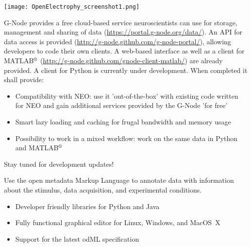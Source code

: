 \begin{multicols}{3}
\vspace{0.5em}
\texttt{[image: OpenElectrophy\_screenshot1.png]}





\vspace{0.5em}

G-Node provides a free cloud-based service neuroscientists can use for storage, management and sharing of data (\url{https://portal.g-node.org/data/}). An API for data access is provided (\url{http://g-node.github.com/g-node-portal/}), allowing developers to code their own clients. A web-based interface as well as a client for MATLAB$^\textrm{\textregistered}$  (\url{http://g-node.github.com/gnode-client-matlab/}) are already provided. A client for Python is currently under development. When completed it shall provide:

\begin{itemize}[nolistsep,topsep=0em,leftmargin=1pc]
\item Compatibility with NEO: use it 'out-of-the-box' with existing code written for NEO and gain additional services provided by the G-Node 'for free'
\item Smart lazy loading and caching for frugal bandwidth and memory usage
\item Possibility to work in a mixed workflow: work on the same data in Python and MATLAB$^\textrm{\textregistered}$
\end{itemize}

Stay tuned for development updates!

%


Use the {open metadata Markup Language} to annotate data with information about the stimulus, data acquisition, and experimental conditions.

\begin{itemize}[nolistsep,topsep=0em,leftmargin=1pc]
\item Developer friendly libraries for Python and Java
\item Fully functional graphical editor for Linux, Windows, and MacOS~X
\item Support for the latest odML specification
\end{itemize}


\end{multicols}
